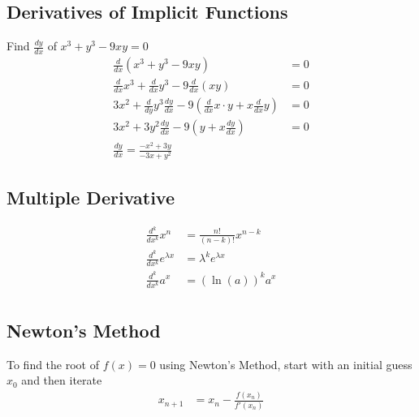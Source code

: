 \documentclass{article}
\begin{document}
\begin{multicols*}{2}
    \subsection*{Derivatives of Implicit Functions}
    Find $\frac{dy}{dx}$ of $x^3+y^3-9xy=0$
    \begin{align*}
        \frac{d}{dx} (x^3 + y^3 - 9xy) &= 0 \\
        \frac{d}{dx} x^3 + \frac{d}{dx} y^3 - 9 \frac{d}{dx} (xy) &= 0 \\
        3x^2 + \frac{d}{dy} y^3 \frac{dy}{dx} - 9 (\frac{d}{dx} x \cdot y + x \frac{d}{dx} y) &= 0 \\
        3x^2 + 3y^2 \frac{dy}{dx} - 9 (y + x \frac{dy}{dx}) &= 0 \\
        \frac{dy}{dx} = \frac{-x^2+3y}{-3x+y^2}
    \end{align*}

    \subsection*{Multiple Derivative}
    \begin{align*}
        \frac{d^k}{dx^k} x^n &= \frac{n!}{(n-k)!}x^{n-k} \\
        \frac{d^k}{dx^k} e^{\lambda x} &= \lambda^k e^{\lambda x} \\
        \frac{d^k}{dx^k} a^x &= (\ln(a))^k a^x \\
    \end{align*}

    \subsection*{Newton's Method}
    To find the root of $f(x) = 0$ using Newton's Method, start with an initial guess $x_0$ and then iterate
    \begin{align*}
        x_{n+1} &= x_n - \frac{f(x_n)}{f'(x_n)} \\
    \end{align*}


\end{multicols*}
\end{document}
